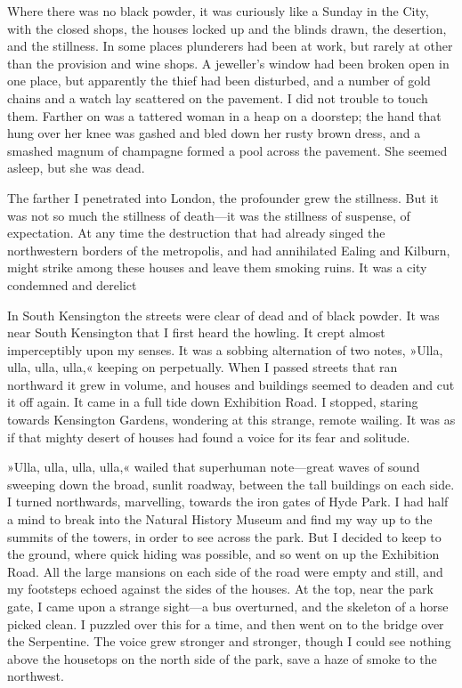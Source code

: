 Where there was no black powder, it was curiously like a Sunday in the City, with the closed shops, the houses locked up and the blinds drawn, the desertion, and the stillness. In some places plunderers had been at work, but rarely at other than the provision and wine shops. A jeweller's window had been broken open in one place, but apparently the thief had been disturbed, and a number of gold chains and a watch lay scattered on the pavement. I did not trouble to touch them. Farther on was a tattered woman in a heap on a doorstep; the hand that hung over her knee was gashed and bled down her rusty brown dress, and a smashed magnum of champagne formed a pool across the pavement. She seemed asleep, but she was dead.

The farther I penetrated into London, the profounder grew the stillness. But it was not so much the stillness of death—it was the stillness of suspense, of expectation. At any time the destruction that had already singed the northwestern borders of the metropolis, and had annihilated Ealing and Kilburn, might strike among these houses and leave them smoking ruins. It was a city condemned and derelict\textellipsis

In South Kensington the streets were clear of dead and of black powder. It was near South Kensington that I first heard the howling. It crept almost imperceptibly upon my senses. It was a sobbing alternation of two notes, »Ulla, ulla, ulla, ulla,« keeping on perpetually. When I passed streets that ran northward it grew in volume, and houses and buildings seemed to deaden and cut it off again. It came in a full tide down Exhibition Road. I stopped, staring towards Kensington Gardens, wondering at this strange, remote wailing. It was as if that mighty desert of houses had found a voice for its fear and solitude.

»Ulla, ulla, ulla, ulla,« wailed that superhuman note—great waves of sound sweeping down the broad, sunlit roadway, between the tall buildings on each side. I turned northwards, marvelling, towards the iron gates of Hyde Park. I had half a mind to break into the Natural History Museum and find my way up to the summits of the towers, in order to see across the park. But I decided to keep to the ground, where quick hiding was possible, and so went on up the Exhibition Road. All the large mansions on each side of the road were empty and still, and my footsteps echoed against the sides of the houses. At the top, near the park gate, I came upon a strange sight—a bus overturned, and the skeleton of a horse picked clean. I puzzled over this for a time, and then went on to the bridge over the Serpentine. The voice grew stronger and stronger, though I could see nothing above the housetops on the north side of the park, save a haze of smoke to the northwest.

